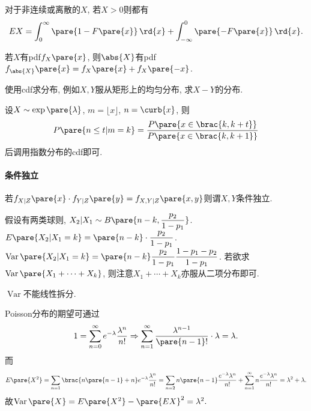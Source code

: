 \documentclass{ctexart}
\DeclareMathOperator{\Var}{Var}
\begin{document}
对于非连续或离散的$X$, 若$X>0$则都有
\[ EX = \int_0^\infty \pare{1-F\pare{x}}\,\rd{x} + \int_{-\infty}^0 \pare{-F\pare{x}}\,\rd{x}. \]
\par
若$X$有pdf$f_X\pare{x}$, 则$\abs{X}$有pdf$f_{\abs{X}}\pare{x} = f_X\pare{x} + f_X\pare{-x}$.
\par
使用cdf求分布, 例如$X,Y$服从矩形上的均匀分布, 求$X-Y$的分布.
\par
\begin{ex}
    设$X\sim \exp\pare{\lambda}$, $m = \lfloor x \rfloor$, $n = \curb{x}$, 则
    \begin{equation}
        P\pare{n\le t\vert m=k} = \frac{P\pare{x\in\brac{k,k+t}}}{P\pare{x\in \brac{k,k+1}}}
    \end{equation}
    后调用指数分布的cdf即可.
\end{ex}
\paragraph{条件独立} %
\label{par:条件独立}

若$f_{X\vert Z} \pare{x} \cdot f_{Y\vert Z} \pare{y} = f_{X,Y\vert Z}\pare{x,y}$则谓$X,Y$条件独立.


\begin{ex}
    假设有两类球则, $X_2\vert X_1 \sim B\pare{n-k, \displaystyle \frac{p_2}{1-p_1}}$. $E\pare{X_2\vert X_1 = k} = \pare{n-k}\cdot\displaystyle \frac{p_2}{1-p_1}$. $\Var\pare{X_2\vert X_1 = k} = \pare{n-k}\displaystyle \frac{p_2}{1-p_1}\frac{1-p_1-p_2}{1-p_1}$. 若欲求$\Var\pare{X_1+\cdots+X_k}$, 则注意$X_1 + \cdots + X_k$亦服从二项分布即可.
\end{ex}
\begin{pitfall}
    $\Var$不能线性拆分.
\end{pitfall}
Poisson分布的期望可通过
\[ 1 = \sum_{n=0}^\infty e^{-\lambda} \frac{\lambda^n}{n!} \Rightarrow \sum_{n=1}^\infty \frac{\lambda^{n-1}}{\pare{n-1}!}\cdot\lambda = \lambda. \]
而
\[ E\pare{X^2} = \sum_{n=1} \brac{n\pare{n-1}+n} e^{-\lambda} \frac{\lambda^n}{n!} = \sum_{n=2} n\pare{n-1}\frac{e^{-\lambda}\lambda^n}{n!} + \sum_{n=1}^\infty n \frac{e^{-\lambda}\lambda^n}{n!} = \lambda^2 + \lambda. \]
故$\Var\pare{X} = E\pare{X^2} - \pare{EX}^2 = \lambda^2.$
\end{document}
